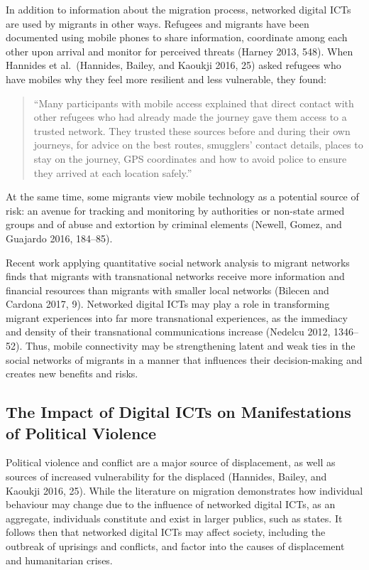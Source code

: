 In addition to information about the migration process, networked
digital ICTs are used by migrants in other ways. Refugees and migrants
have been documented using mobile phones to share information,
coordinate among each other upon arrival and monitor for perceived
threats (Harney 2013, 548). When Hannides et al.~(Hannides, Bailey, and
Kaoukji 2016, 25) asked refugees who have mobiles why they feel more
resilient and less vulnerable, they found:

\begin{quote}
``Many participants with mobile access explained that direct contact
with other refugees who had already made the journey gave them access to
a trusted network. They trusted these sources before and during their
own journeys, for advice on the best routes, smugglers' contact details,
places to stay on the journey, GPS coordinates and how to avoid police
to ensure they arrived at each location safely.''
\end{quote}

At the same time, some migrants view mobile technology as a potential
source of risk: an avenue for tracking and monitoring by authorities or
non-state armed groups and of abuse and extortion by criminal elements
(Newell, Gomez, and Guajardo 2016, 184--85).

Recent work applying quantitative social network analysis to migrant
networks finds that migrants with transnational networks receive more
information and financial resources than migrants with smaller local
networks (Bilecen and Cardona 2017, 9). Networked digital ICTs may play
a role in transforming migrant experiences into far more transnational
experiences, as the immediacy and density of their transnational
communications increase (Nedelcu 2012, 1346--52). Thus, mobile
connectivity may be strengthening latent and weak ties in the social
networks of migrants in a manner that influences their decision-making
and creates new benefits and risks.

\hypertarget{the-impact-of-digital-icts-on-manifestations-of-political-violence}{%
\subsection{The Impact of Digital ICTs on Manifestations of Political
Violence}\label{the-impact-of-digital-icts-on-manifestations-of-political-violence}}

Political violence and conflict are a major source of displacement, as
well as sources of increased vulnerability for the displaced (Hannides,
Bailey, and Kaoukji 2016, 25). While the literature on migration
demonstrates how individual behaviour may change due to the influence of
networked digital ICTs, as an aggregate, individuals constitute and
exist in larger publics, such as states. It follows then that networked
digital ICTs may affect society, including the outbreak of uprisings and
conflicts, and factor into the causes of displacement and humanitarian
crises.

